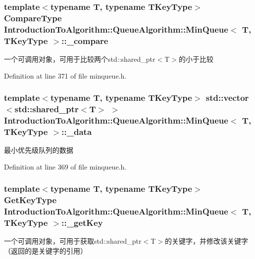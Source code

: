 \subsubsection[{\+\_\+compare}]{\setlength{\rightskip}{0pt plus 5cm}template$<$typename T, typename T\+Key\+Type$>$ {\bf Compare\+Type} {\bf Introduction\+To\+Algorithm\+::\+Queue\+Algorithm\+::\+Min\+Queue}$<$ T, T\+Key\+Type $>$\+::\+\_\+compare\hspace{0.3cm}{\ttfamily [private]}}\label{class_introduction_to_algorithm_1_1_queue_algorithm_1_1_min_queue_a5de60762d317fc92c18e882dd50f8dfa}
一个可调用对象，可用于比较两个std\+::shared\+\_\+ptr$<$\+T$>$的小于比较 

Definition at line 371 of file minqueue.\+h.

\hypertarget{class_introduction_to_algorithm_1_1_queue_algorithm_1_1_min_queue_ad463395cef741624e6d078e4e4fc624f}{}
\subsubsection[{\+\_\+data}]{\setlength{\rightskip}{0pt plus 5cm}template$<$typename T, typename T\+Key\+Type$>$ std\+::vector$<$std\+::shared\+\_\+ptr$<$T$>$ $>$ {\bf Introduction\+To\+Algorithm\+::\+Queue\+Algorithm\+::\+Min\+Queue}$<$ T, T\+Key\+Type $>$\+::\+\_\+data\hspace{0.3cm}{\ttfamily [private]}}\label{class_introduction_to_algorithm_1_1_queue_algorithm_1_1_min_queue_ad463395cef741624e6d078e4e4fc624f}
最小优先级队列的数据 

Definition at line 369 of file minqueue.\+h.

\hypertarget{class_introduction_to_algorithm_1_1_queue_algorithm_1_1_min_queue_a3f791f9dd9d61dc2caf1d6b2b354f4c4}{}
\subsubsection[{\+\_\+get\+Key}]{\setlength{\rightskip}{0pt plus 5cm}template$<$typename T, typename T\+Key\+Type$>$ {\bf Get\+Key\+Type} {\bf Introduction\+To\+Algorithm\+::\+Queue\+Algorithm\+::\+Min\+Queue}$<$ T, T\+Key\+Type $>$\+::\+\_\+get\+Key\hspace{0.3cm}{\ttfamily [private]}}\label{class_introduction_to_algorithm_1_1_queue_algorithm_1_1_min_queue_a3f791f9dd9d61dc2caf1d6b2b354f4c4}
一个可调用对象，可用于获取std\+::shared\+\_\+ptr$<$\+T$>$的关键字，并修改该关键字（返回的是关键字的引用） 

